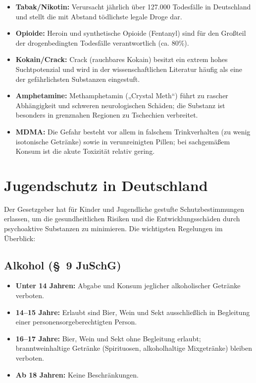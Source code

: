 \documentclass[11pt,a4paper]{article}
\begin{document}
	\begin{itemize}[leftmargin=*, noitemsep]
		\item \textbf{Tabak/Nikotin:} Verursacht jährlich über 127.000 Todesfälle in Deutschland und stellt die mit Abstand tödlichste legale Droge dar\cite{dhs-tabak}.
		\item \textbf{Opioide:} Heroin und synthetische Opioide (Fentanyl) sind für den Großteil der drogenbedingten Todesfälle verantwortlich (ca. 80\%)\cite{drugcom-opioid}.
		\item \textbf{Kokain/Crack:} Crack (rauchbares Kokain) besitzt ein extrem hohes Suchtpotenzial und wird in der wissenschaftlichen Literatur häufig als eine der gefährlichsten Substanzen eingestuft\cite{nutt-scale}.
		\item \textbf{Amphetamine:} Methamphetamin („Crystal Meth“) führt zu rascher Abhängigkeit und schweren neurologischen Schäden; die Substanz ist besonders in grenznahen Regionen zu Tschechien verbreitet\cite{dhs-crystal}.
		\item \textbf{MDMA:} Die Gefahr besteht vor allem in falschem Trinkverhalten (zu wenig isotonische Getränke) sowie in verunreinigten Pillen; bei sachgemäßem Konsum ist die akute Toxizität relativ gering\cite{drugcom-mdma}.
	\end{itemize}
	
	\section{Jugendschutz in Deutschland}
	
	Der Gesetzgeber hat für Kinder und Jugendliche gestufte Schutzbestimmungen erlassen, um die gesundheitlichen Risiken und die Entwicklungsschäden durch psychoaktive Substanzen zu minimieren. Die wichtigsten Regelungen im Überblick:
	
	\subsection{Alkohol (\S~9 JuSchG)}
	\begin{itemize}[leftmargin=*, noitemsep]
		\item \textbf{Unter 14 Jahren:} Abgabe und Konsum jeglicher alkoholischer Getränke verboten.
		\item \textbf{14–15 Jahre:} Erlaubt sind Bier, Wein und Sekt ausschließlich in Begleitung einer personensorgeberechtigten Person.
		\item \textbf{16–17 Jahre:} Bier, Wein und Sekt ohne Begleitung erlaubt; branntweinhaltige Getränke (Spirituosen, alkoholhaltige Mixgetränke) bleiben verboten.
		\item \textbf{Ab 18 Jahren:} Keine Beschränkungen.
	\end{itemize}
	
\end{document}
